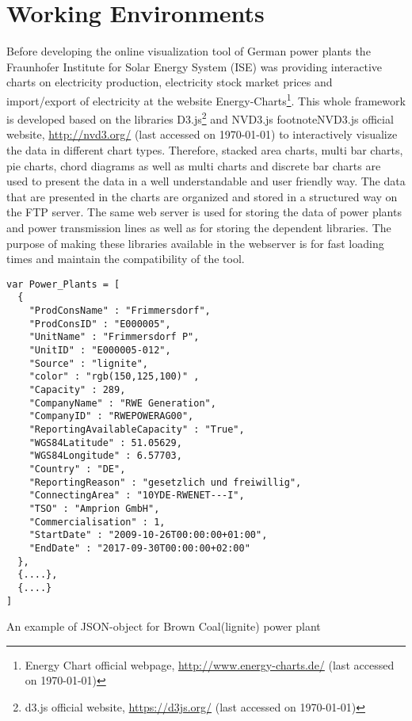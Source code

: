 \section{Working Environments}

Before developing the online visualization tool of German power plants the Fraunhofer Institute for Solar Energy System (ISE) was providing interactive charts on electricity production, electricity stock market prices and import/export of electricity at the website Energy-Charts\footnote{Energy Chart official webpage, \url{http://www.energy-charts.de/} (last accessed on {\today})}. This whole framework is developed based on the libraries D3.js\footnote{d3.js official website, \url{https://d3js.org/} (last accessed on {\today})}  and NVD3.js footnote{NVD3.js official website, \url{http://nvd3.org/} (last accessed on {\today})} to interactively visualize the data in different chart types. Therefore, stacked area charts, multi bar charts, pie charts, chord diagrams as well as multi charts and discrete bar charts are used to present the data in a well understandable and user friendly way. The data that are presented in the charts are organized and stored in a structured way on the FTP server. The same web server is used for storing the data of power plants and power transmission lines as well as for storing the dependent libraries. The purpose of making these libraries available in the webserver is for fast loading times and maintain the compatibility of the tool.

\begin{Listing}
\begin{lstlisting}
var Power_Plants = [
  { 
    "ProdConsName" : "Frimmersdorf",
    "ProdConsID" : "E000005",
    "UnitName" : "Frimmersdorf P",
    "UnitID" : "E000005-012",
    "Source" : "lignite",
    "color" : "rgb(150,125,100)" ,
    "Capacity" : 289,
    "CompanyName" : "RWE Generation",
    "CompanyID" : "RWEPOWERAG00",
    "ReportingAvailableCapacity" : "True",
    "WGS84Latitude" : 51.05629,
    "WGS84Longitude" : 6.57703,
    "Country" : "DE",
    "ReportingReason" : "gesetzlich und freiwillig",
    "ConnectingArea" : "10YDE-RWENET---I",
    "TSO" : "Amprion GmbH",
    "Commercialisation" : 1,
    "StartDate" : "2009-10-26T00:00:00+01:00",
    "EndDate" : "2017-09-30T00:00:00+02:00"
  },
  {....},
  {....}
]
\end{lstlisting}
\caption{An example of JSON-object for Brown Coal(lignite) power plant}
\label{lst:pp-json}
\end{Listing}

